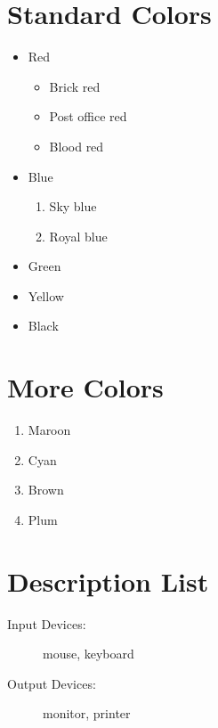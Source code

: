 \documentclass{article}
\begin{document}
	\section{Standard Colors}
	\begin{itemize}
		\item Red
		\begin{itemize} %
			\item Brick red
			\item Post office red
			\item Blood red
		\end{itemize}
		\item Blue
		\begin{enumerate} %
			\item Sky blue
			\item Royal blue
		\end{enumerate}
		\item Green
		\item Yellow
		\item Black
	\end{itemize}
	
	\section{More Colors}
	\begin{enumerate}
		\item Maroon
		\item Cyan
		\item Brown
		\item Plum
	\end{enumerate}
	
	\section{Description List}
	\begin{description}
		\item[Input Devices:] mouse, keyboard
		\item[Output Devices:] monitor, printer
	\end{description}
\end{document}
